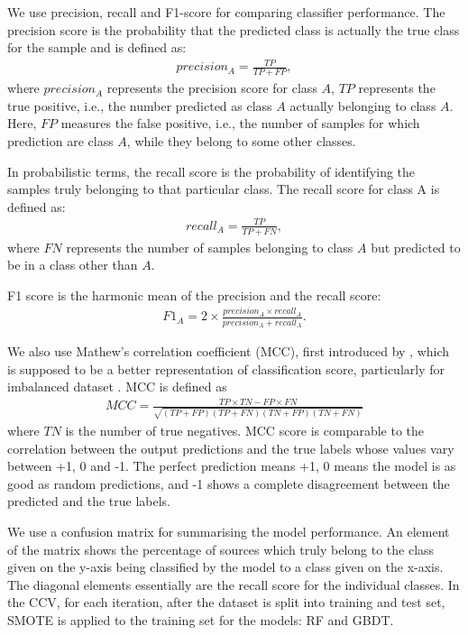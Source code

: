 \documentclass[fleqn,usenatbib]{mnras}
\begin{document}
    We use precision, recall and F1-score for comparing classifier performance. 
    The precision score is the probability that the predicted class is actually the true class for the sample and is defined as:
    \begin{align}
        precision_A = \frac{TP}{TP+FP},
    \end{align}
    where $precision_A$ represents the precision score for class $A$, $TP$ represents the true positive, i.e., the number predicted as class $A$ actually belonging to class $A$. Here, $FP$ measures the false positive, i.e., the number of samples for which prediction are class $A$, while they belong to some other classes.
    
    In probabilistic terms, the recall score is the probability of identifying the samples truly belonging to that particular class. The recall score for class A is defined as:
    \begin{align}
         recall_A = \frac{TP}{TP+FN},
    \end{align}
    where $FN$ represents the number of samples belonging to class $A$ but predicted to be in a class other than $A$.
    
    F1 score is the harmonic mean of the precision and the recall score: 
    \begin{align}
         F1_A = 2\times \frac{precision_A\times recall_A}{precision_A+recall_A}.
    \end{align}

    We also use Mathew's correlation coefficient (MCC), first introduced by  \cite{MATTHEWS1975442}, which is supposed to be a better representation of classification score, particularly for imbalanced dataset \citep{boughorbel2017optimal}. MCC is defined as 
    \begin{align}
            MCC = \frac{TP\times TN - FP\times FN}{\sqrt{(TP+FP)(TP+FN)(TN+FP)(TN+FN)}}
    \end{align}
    where $TN$ is the number of true negatives. MCC score is comparable to the correlation between the output predictions and the true labels whose values vary between +1, 0 and -1. The perfect prediction means +1, 0 means the model is as good as random predictions, and -1 shows a complete disagreement between the predicted and the true labels. 
    

    
    We use a confusion matrix for summarising the model performance. An element of the matrix shows the percentage of sources which truly belong to the class given on the y-axis being classified by the model to a class given on the x-axis. The diagonal elements essentially are the recall score for the individual classes. In the CCV, for each iteration, after the dataset is split into training and test set, SMOTE is applied to the training set for the models: RF and GBDT.
    
\end{document}
